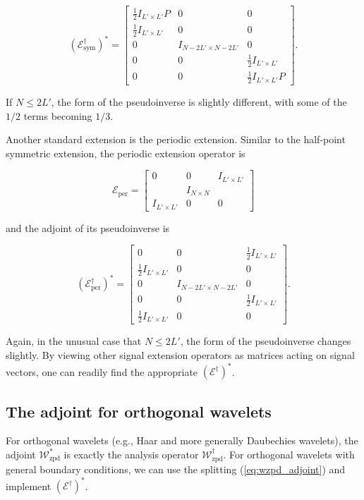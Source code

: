 \documentclass[journal]{IEEEtran}
\begin{document}
\[ \left(\mathcal{E}_\text{sym}^\dagger\right)^\ast = \begin{bmatrix}\frac{1}{2}I_{L'\times L'}P & 0 & 0\\\frac{1}{2}I_{L'\times L'} & 0 & 0\\0 & I_{N-2L'\times N-2L'} & 0\\0&0&\frac{1}{2}I_{L'\times L'}\\0&0&\frac{1}{2}I_{L'\times L'}P\end{bmatrix}. \]

\noindent If ${N \le 2L'}$, the form of the pseudoinverse is slightly different, with some of the $1/2$ terms becoming $1/3$.

Another standard extension is the periodic extension.  Similar to the half-point symmetric extension, the periodic extension operator is

\[ \mathcal{E}_\text{per} = \begin{bmatrix} 0 & 0 & I_{L'\times L'}\\&I_{N\times N}&\\I_{L'\times L'}&0&0\end{bmatrix} \] 

\noindent and the adjoint of its pseudoinverse is

\[ \left(\mathcal{E}_\text{per}^\dagger\right)^\ast = \begin{bmatrix} 0 & 0 & \frac{1}{2}I_{L'\times L'}\\\frac{1}{2}I_{L'\times L'}&0&0\\0&I_{N-2L'\times N-2L'}&0\\0&0&\frac{1}{2}I_{L'\times L'}\\\frac{1}{2}I_{L'\times L'}&0&0\end{bmatrix}. \] 

\noindent Again, in the unusual case that $N\le 2L'$, the form of the pseudoinverse changes slightly.  By viewing other signal extension operators as matrices acting on signal vectors, one can readily find the appropriate $(\mathcal{E}^\dagger)^\ast$.


\subsection{The adjoint for orthogonal wavelets}
For orthogonal wavelets (e.g., Haar and more generally Daubechies wavelets), the adjoint $\mathcal{W}_\text{zpd}^\ast$ is exactly the analysis operator $\mathcal{W}_\text{zpd}^\dagger$.  For orthogonal wavelets with general boundary conditions, we can use the splitting (\ref{eq:wzpd_adjoint}) and implement $\left(\mathcal{E}^\dagger\right)^\ast$.
\end{document}
